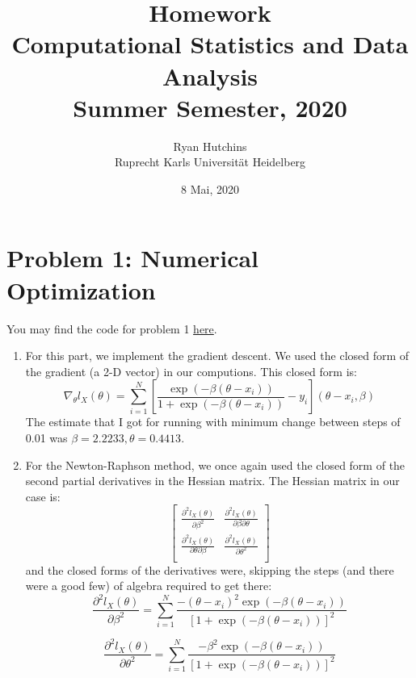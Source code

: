 \documentclass[a4paper,12pt]{article}
\title{
	Homework  \\
	\large Computational Statistics and Data Analysis \\
	\large Summer Semester, 2020
	}
\author{Ryan Hutchins \\ 
Ruprecht Karls Universit\"at Heidelberg}
\date{8 Mai, 2020}
\begin{document}
\maketitle
\section{Problem 1: Numerical Optimization}
You may find the code for problem 1 \href{https://github.com/GoliathMarks/Computational_Statistics/tree/master/CompStatsHomeworkFour}{here}.
\begin{enumerate}
\item For this part, we implement the gradient descent. We used the closed form of the gradient (a 2-D vector) in our computions. This closed form is:
\begin{equation}
\nabla_{\theta}l_{X}(\theta) = \sum_{i=1}^{N}{\left[ \frac{ \exp(-\beta (\theta -x_{i})) } { 1 + \exp(-\beta (\theta -x_{i})) } - y_{i}  \right] \left( \theta - x_{i}, \beta  \right)  }
\end{equation}
The estimate that I got for running with minimum change between steps of 0.01 was $\beta = 2.2233, \theta =0.4413$.


\item For the Newton-Raphson method, we once again used the closed form of the second partial derivatives in the Hessian matrix. The Hessian matrix in our case is:
$$
\begin{bmatrix}
\frac{\partial^{2}l_{X}(\theta)}{\partial \beta^{2}} & \frac{\partial^{2}l_{X}(\theta)}{\partial \beta \partial \theta} \\
\frac{\partial^{2}l_{X}(\theta)}{\partial \theta \partial \beta} & \frac{\partial^{2}l_{X}(\theta)}{\partial \theta^{2}} \\
\end{bmatrix}
$$
and the closed forms of the derivatives were, skipping the steps (and there were a good few) of algebra required to get there:
\begin{equation}
\frac{\partial^{2}l_{X}(\theta)}{\partial \beta^{2}} = \sum_{i=1}^{N}{  \frac{ -(\theta - x_{i})^{2}  \exp(-\beta (\theta -x_{i}))   }{\left[  1 + \exp(-\beta (\theta -x_{i}))   \right]^{2} }  }
\end{equation}

\begin{equation}
\frac{\partial^{2}l_{X}(\theta)}{\partial \theta^{2}} = \sum_{i=1}^{N}{  \frac{  -\beta^{2} \exp(-\beta (\theta -x_{i})) }  {\left[  1 + \exp(-\beta (\theta -x_{i}))   \right]^{2} }  }
\end{equation}


\end{enumerate}
\end{document}
